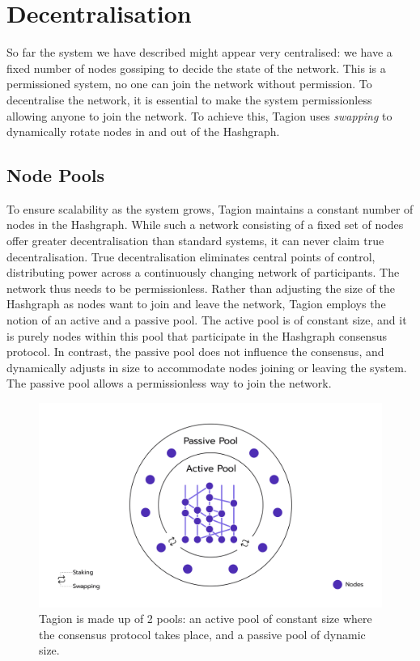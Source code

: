 \section{Decentralisation}
    So far the system we have described might appear very centralised: we have a fixed number of nodes gossiping to decide the state of the network. This is a permissioned system, no one can join the network without permission. To decentralise the network, it is essential to make the system permissionless allowing anyone to join the network. To achieve this, Tagion uses \textit{swapping} to dynamically rotate nodes in and out of the Hashgraph.

\subsection{Node Pools}
    To ensure scalability as the system grows, Tagion maintains a constant number of nodes in the Hashgraph. While such a network consisting of a fixed set of nodes offer greater decentralisation than standard systems, it can never claim true decentralisation. True decentralisation eliminates central points of control, distributing power across a continuously changing network of participants. The network thus needs to be permissionless. Rather than adjusting the size of the Hashgraph as nodes want to join and leave the network, Tagion employs the notion of an active and a passive pool. The active pool is of constant size, and it is purely nodes within this pool that participate in the Hashgraph consensus protocol. In contrast, the passive pool does not influence the consensus, and dynamically adjusts in size to accommodate nodes joining or leaving the system. The passive pool allows a permissionless way to join the network.

\begin{figure}[H]
	\centering
	\includegraphics[width=1\textwidth]{figures/pools.png}
	\caption{Tagion is made up of 2 pools: an active pool of constant size where the consensus protocol takes place, and a passive pool of dynamic size.}
	\label{figure:pools}
\end{figure}


